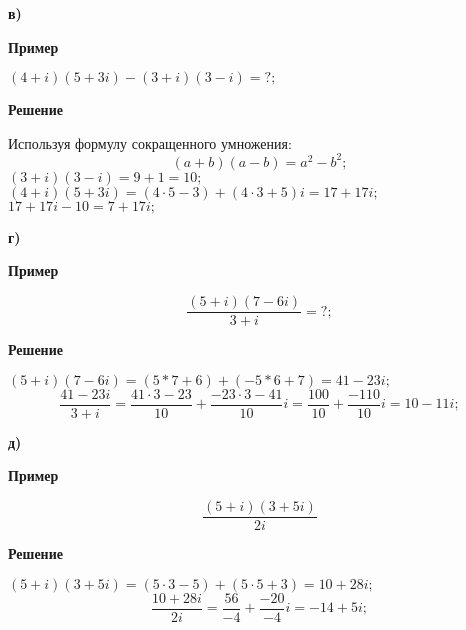 \documentclass[12pt]{article}
\begin{document}
\newpage
\textbf{в)}\\
\begin{center}\textbf{Пример}\end{center}
$(4+i)(5+3i)-(3+i)(3-i) = ?;$
\begin{center}\textbf{Решение}\end{center}
Используя формулу сокращенного умножения:
$$(a+b)(a-b)=a^2-b^2;$$
$(3+i)(3-i) = 9 + 1 = 10;$\\
$(4+i)(5+3i)= (4\cdot5 - 3)+(4\cdot3+5)i=17+17i;$\\
$17+17i-10=7+17i;$

\newpage
\textbf{г)}\\
\begin{center}\textbf{Пример}\end{center}
$$\frac{(5+i)(7-6i)}{3+i} = ?;$$
\begin{center}\textbf{Решение}\end{center}
$(5+i)(7-6i)=(5*7+6)+(-5*6+7)=41-23i;$\\
$$
\frac{41-23i}{3+i}=
\frac{41\cdot3-23}{10}+\frac{-23\cdot3-41}{10}i=
\frac{100}{10}+\frac{-110}{10}i=
10-11i;
$$

\newpage
\textbf{д)}\\
\begin{center}\textbf{Пример}\end{center}
$$\frac{(5+i)(3+5i)}{2i}$$
\begin{center}\textbf{Решение}\end{center}
$(5+i)(3+5i)=(5\cdot3-5)+(5\cdot5 + 3)=10+28i;$
$$
\frac{10+28i}{2i}=
\frac{56}{-4}+
\frac{-20}{-4}i=
-14+5i;
$$
\end{document}
